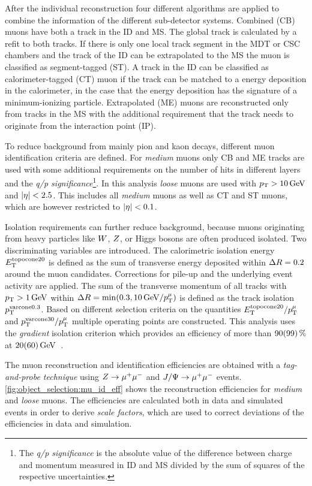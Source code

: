 After the individual reconstruction four different algorithms are applied to combine the information of the different
sub-detector systems.
Combined (CB) muons have both a track in the ID and MS\@. The global track is calculated by a refit to both tracks.
If there is only one local track segment in the MDT or CSC chambers and the track of the ID can be extrapolated to the MS
the muon is classified as segment-tagged (ST).
A track in the ID can be classified as calorimeter-tagged (CT) muon if the track can be matched to a energy deposition
in the calorimeter, in the case that the energy deposition has the signature of a minimum-ionizing particle.
Extrapolated (ME) muons are reconstructed only from tracks in the MS with the additional requirement that the track
needs to originate from the interaction point (IP)\@.

To reduce background from mainly pion and kaon decays, different muon identification criteria are defined.
For \emph{medium} muons only CB and ME tracks are used with some additional requirements on the number of hits in
different layers and the \emph{q/p significance}\footnote{The \emph{q/p significance} is the absolute value of the
difference between charge and momentum measured in ID and MS divided by the sum of squares of the respective uncertainties.}.
In this analysis \emph{loose} muons are used with $\pt > \unit[10]{GeV}$ and $\left|\eta\right| < 2.5$.
This includes all \emph{medium} muons as well as CT and ST muons, which are however restricted to $\left|\eta\right| < 0.1$.

Isolation requirements can further reduce background, because muons originating from heavy particles like $W$, $Z$,
or Higgs bosons are often produced isolated. Two discriminating variables are introduced.
The calorimetric isolation energy $E_\text{T}^{\text{topocone}20}$ is defined as the sum of transverse energy deposited within
$\Delta R = 0.2$ around the muon candidates.
Corrections for pile-up and the underlying event activity are applied.
The sum of the transverse momentum of all tracks with $\pt > \unit[1]{GeV}$ within $\dr = \min(0.3, \unit[10]{GeV} / \pt^\mu)$
is defined as the track isolation $p_\text{T}^{\text{varcone}0.3}$.
Based on different selection criteria on the quantities $E_\text{T}^{\text{topocone}20} / p_\text{T}^\mu$ and
$p_\text{T}^{\text{varcone}30} / p_\text{T}^\mu$ multiple operating points are constructed.
This analysis uses the \emph{gradient} isolation criterion which provides an efficiency of more than
$\unit[90(99)]{\%}$ at $\unit[20(60)]{GeV}$~\cite{PERF-2015-10}.

The muon reconstruction and identification efficiencies are obtained with a \emph{tag-and-probe technique} using
$Z \to \mu^+\mu^-$ and $J/\Psi \to \mu^+\mu^-$ events.
\cref{fig:object_selection:mu_id_eff} shows the reconstruction efficiencies for \emph{medium} and \emph{loose} muons.
The efficiencies are calculated both in data and simulated events in order to derive \emph{scale factors}, which are used
to correct deviations of the efficiencies in data and simulation.

